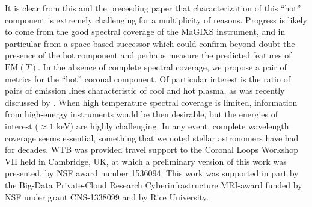 \documentclass[preprint]{aastex}
\begin{document}
	\par It is clear from this and the preceeding paper that characterization of this ``hot'' component is extremely challenging for a multiplicity of reasons. Progress is likely to come from the good spectral coverage of the MaGIXS instrument, and in particular from a space-based successor which could confirm beyond doubt the presence of the hot component and perhaps measure the predicted features of $\mathrm{EM}(T)$. In the absence of complete spectral coverage, we propose a pair of metrics for the ``hot'' coronal component. Of particular interest is the ratio of pairs of emission lines characteristic of cool and hot plasma, as was recently discussed by \citet{brosius_pervasive_2014}. When high temperature spectral coverage is limited, information from high-energy instruments \citep{ishikawa_constraining_2014,hannah_first_2016,grefenstette_first_2016} would be then desirable, but the energies of interest ($\approx1$ keV) are highly challenging. In any event, complete wavelength coverage seems essential, something that we noted stellar astronomers have had for decades.
	\acknowledgments
	WTB was provided travel support to the Coronal Loops Workshop VII held in Cambridge, UK, at which a preliminary version of this work was presented, by NSF award number 1536094. This work was supported in part by the Big-Data Private-Cloud Research Cyberinfrastructure MRI-award funded by NSF under grant CNS-1338099 and by Rice University.
	
	
\end{document}
